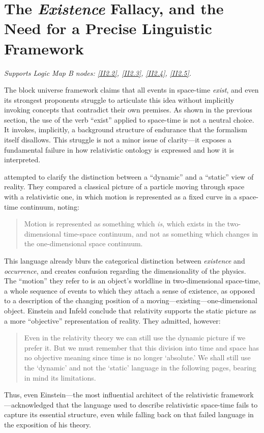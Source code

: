 \documentclass[12pt]{book}
\begin{document}
\section[The \textit{Existence} Fallacy]{The \textit{Existence} Fallacy, and the Need for a Precise Linguistic Framework}\label{sec:3.4}
\noindent\textit{Supports Logic Map B nodes: \hyperref[appendix:II2.2]{[II2.2]}, \hyperref[appendix:II2.3]{[II2.3]}, \hyperref[appendix:II2.4]{[II2.4]}, \hyperref[appendix:II2.5]{[II2.5]}.}

\vspace{4pt}

The block universe framework claims that all events in space-time \textit{exist}, and even its strongest proponents struggle to articulate this idea without implicitly invoking concepts that contradict their own premises. As shown in the previous section, the use of the verb ``exist'' applied to space-time is not a neutral choice. It invokes, implicitly, a background structure of endurance that the formalism itself disallows. This struggle is not a minor issue of clarity---it exposes a fundamental failure in how relativistic ontology is expressed and how it is interpreted.

\citet{Einstein1938} attempted to clarify the distinction between a ``dynamic'' and a ``static'' view of reality. They compared a classical picture of a particle moving through space with a relativistic one, in which motion is represented as a fixed curve in a space-time continuum, noting:
\begin{quote}
Motion is represented as something which \textit{is}, which exists in the two-dimensional time-space continuum, and not as something which changes in the one-dimensional space continuum.
\end{quote}
This language already blurs the categorical distinction between \textit{existence} and \textit{occurrence}, and creates confusion regarding the dimensionality of the physics. The ``motion'' they refer to is an object's worldline in two-dimensional space-time, a whole sequence of events to which they attach a sense of existence, as opposed to a description of the changing position of a moving---existing---one-dimensional object. Einstein and Infeld conclude that relativity supports the static picture as a more ``objective'' representation of reality. They admitted, however:
\begin{quote}
Even in the relativity theory we can still use the dynamic picture if we prefer it. But we must remember that this division into time and space has no objective meaning since time is no longer `absolute.' We shall still use the `dynamic' and not the `static' language in the following pages, bearing in mind its limitations.
\end{quote}
Thus, even Einstein---the most influential architect of the relativistic framework---acknowledged that the language used to describe relativistic space-time fails to capture its essential structure, even while falling back on that failed language in the exposition of his theory.
\end{document}
